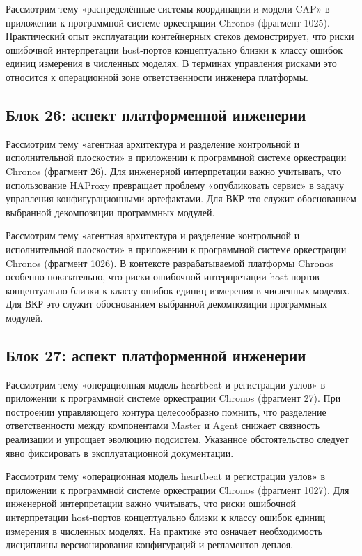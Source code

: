  Рассмотрим тему «распределённые системы координации и модели CAP» в приложении к программной системе оркестрации Chronos (фрагмент 1025). Практический опыт эксплуатации контейнерных стеков демонстрирует, что риски ошибочной интерпретации host-портов концептуально близки к классу ошибок единиц измерения в численных моделях. В терминах управления рисками это относится к операционной зоне ответственности инженера платформы.

\subsection{Блок 26: аспект платформенной инженерии}
 Рассмотрим тему «агентная архитектура и разделение контрольной и исполнительной плоскости» в приложении к программной системе оркестрации Chronos (фрагмент 26). Для инженерной интерпретации важно учитывать, что использование HAProxy превращает проблему «опубликовать сервис» в задачу управления конфигурационными артефактами. Для ВКР это служит обоснованием выбранной декомпозиции программных модулей.

 Рассмотрим тему «агентная архитектура и разделение контрольной и исполнительной плоскости» в приложении к программной системе оркестрации Chronos (фрагмент 1026). В контексте разрабатываемой платформы Chronos особенно показательно, что риски ошибочной интерпретации host-портов концептуально близки к классу ошибок единиц измерения в численных моделях. Для ВКР это служит обоснованием выбранной декомпозиции программных модулей.

\subsection{Блок 27: аспект платформенной инженерии}
 Рассмотрим тему «операционная модель heartbeat и регистрации узлов» в приложении к программной системе оркестрации Chronos (фрагмент 27). При построении управляющего контура целесообразно помнить, что разделение ответственности между компонентами Master и Agent снижает связность реализации и упрощает эволюцию подсистем. Указанное обстоятельство следует явно фиксировать в эксплуатационной документации.

 Рассмотрим тему «операционная модель heartbeat и регистрации узлов» в приложении к программной системе оркестрации Chronos (фрагмент 1027). Для инженерной интерпретации важно учитывать, что риски ошибочной интерпретации host-портов концептуально близки к классу ошибок единиц измерения в численных моделях. На практике это означает необходимость дисциплины версионирования конфигураций и регламентов деплоя.

